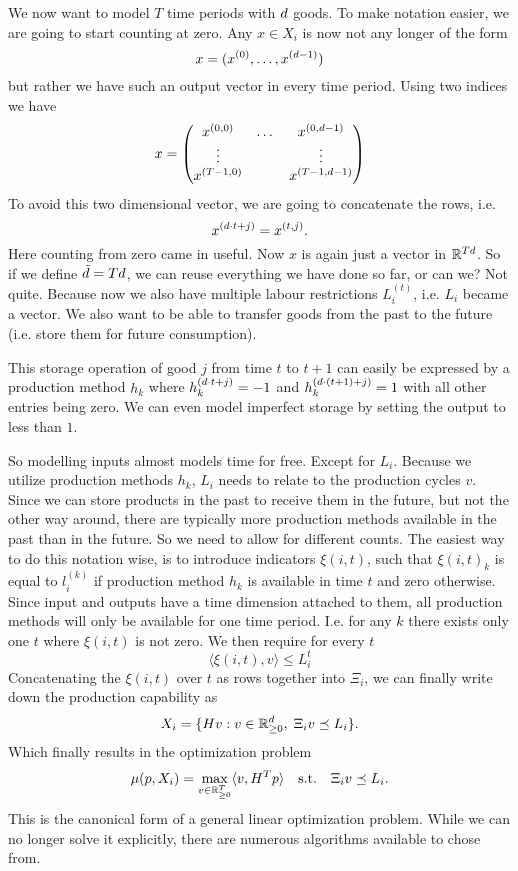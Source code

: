 We now want to model \(T\) time periods with \(d\) goods. To make notation
easier, we are going to start counting at zero. Any \(x\in X_i\) is now not
any longer of the form
\[
	x=(x^{(0)},\dots, x^{(d-1)})
\]
but rather we have such an output vector in every time period. Using two indices
we have
\[
	x=\begin{pmatrix}
		x^{(0,0)} & \dots & x^{(0, d-1)}\\
		\vdots & & \vdots\\
		x^{(T-1,0)} & & x^{(T-1,d-1)}
	\end{pmatrix}
\]
To avoid this two dimensional vector, we are going to concatenate the rows,
i.e.
\[
	x^{(d\cdot t + j)} = x^{(t,j)}.
\]
Here counting from zero came in useful. Now \(x\) is again just a vector in
\(\mathbb{R}^{Td}\). So if we define \(\tilde{d}=Td\), we can reuse
everything we have done so far, or can we? Not quite. Because now we also have
multiple labour restrictions \(L_i^{(t)}\), i.e. \(L_i\) became a vector.
We also want to be able to transfer goods from the past to the future (i.e.
store them for future consumption).

This storage operation of good \(j\) from time \(t\) to \(t+1\) can easily be
expressed by a production method \(h_{k}\) where \(h_k^{(d\cdot t+j)}=-1\)
and \(h_k^{(d\cdot (t+1) + j)}=1\) with all other entries being zero.
We can even model imperfect storage by setting the output to less than \(1\).

So modelling inputs almost models time for free. Except for \(L_i\). Because
we utilize production methods \(h_k\), \(L_i\) needs to relate to the
production cycles \(v\).
Since we can store products in the past to receive them in the future, but not
the other way around, there are typically more production methods 
available in the past than in the future. So we need to allow for different
counts. 
The easiest way to do this notation wise, is to introduce indicators \(\xi(i,t)\),
such that \(\xi(i,t)_k\) is equal to \(l_i^{(k)}\) if production method \(h_k\)
is available in time \(t\) and zero otherwise. Since input and outputs have a
time dimension attached to them, all production methods will only be available
for one time period. I.e. for any \(k\) there exists only one \(t\) where
\(\xi(i,t)\) is not zero. We then require for every \(t\)
\[
	\langle \xi(i,t), v\rangle \le L_i^t
\]
Concatenating the \(\xi(i,t)\) over \(t\) as rows together into \(\Xi_i\), we
can finally write down the production capability as 
\[
	X_i = \{ Hv : v\in \mathbb{R}_{\ge 0}^d,\; \Xi_i v \preceq L_i\}.
\]
Which finally results in the optimization problem
\[
	\mu(p, X_i) = \max_{v\in \mathbb{R}_{\ge 0}^T} \langle v, H^T p\rangle 
	\quad\text{s.t.}\quad
	\Xi_i v \preceq L_i.
\]
This is the canonical form of a general linear optimization problem. While we
can no longer solve it explicitly, there are numerous algorithms available to
chose from. 
